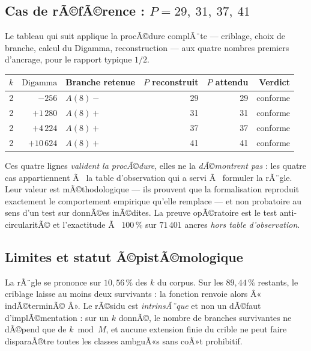 \subsection{Cas de rÃ©fÃ©rence : $P = 29,\ 31,\ 37,\ 41$}

Le tableau qui suit applique la procÃ©dure complÃ¨te --- criblage, choix
de branche, calcul du Digamma, reconstruction --- aux quatre nombres
premiers d'ancrage, pour le rapport typique $1/2$.

\begin{center}
\small
\begin{tabular}{@{}r r l r r r@{}}
\toprule
\rowcolor{spectralgris}
$k$ & $\mathrm{Digamma}$ & Branche retenue & $P$ reconstruit & $P$ attendu & Verdict \\
\midrule
2 & $-256$     & $A(8)-$ & 29 & 29 & conforme \\
2 & $+1\,280$  & $A(8)+$ & 31 & 31 & conforme \\
2 & $+4\,224$  & $A(8)+$ & 37 & 37 & conforme \\
2 & $+10\,624$ & $A(8)+$ & 41 & 41 & conforme \\
\bottomrule
\end{tabular}
\end{center}

\begin{boitealerte}
Ces quatre lignes \emph{valident la procÃ©dure}, elles ne la
\emph{dÃ©montrent pas} : les quatre cas appartiennent Ã  la table
d'observation qui a servi Ã  formuler la rÃ¨gle. Leur valeur est
mÃ©thodologique --- ils prouvent que la formalisation reproduit
exactement le comportement empirique qu'elle remplace --- et non
probatoire au sens d'un test sur donnÃ©es inÃ©dites. La preuve
opÃ©ratoire est le test anti-circularitÃ© et l'exactitude Ã 
$100\,\%$ sur $71\,401$ ancres \emph{hors table d'observation}.
\end{boitealerte}
\subsection{Limites et statut Ã©pistÃ©mologique}

\begin{boitealerte}
La rÃ¨gle se prononce sur $10{,}56\,\%$ des $k$ du corpus. Sur les
$89{,}44\,\%$ restants, le criblage laisse au moins deux survivants :
la fonction renvoie alors Â« indÃ©terminÃ© Â». Le rÃ©sidu est
\emph{intrinsÃ¨que} et non un dÃ©faut d'implÃ©mentation : sur un
$k$ donnÃ©, le nombre de branches survivantes ne dÃ©pend que de
$k \bmod M$, et aucune extension finie du crible ne peut faire
disparaÃ®tre toutes les classes ambguÃ«s sans coÃ»t prohibitif.
\end{boitealerte}

